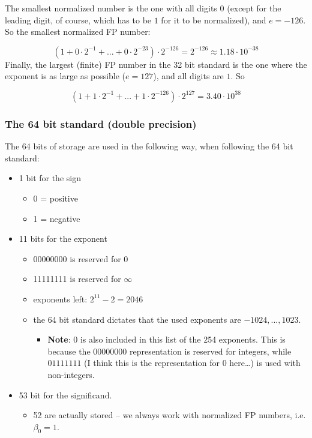 \documentclass[]{book}
\providecommand{\tightlist}{%
  \setlength{\itemsep}{0pt}\setlength{\parskip}{0pt}}
\theoremstyle{definition}
\theoremstyle{definition}
\theoremstyle{definition}
\theoremstyle{remark}
\begin{document}
The smallest normalized number is the one with all digits \(0\) (except
for the leading digit, of course, which has to be \(1\) for it to be
normalized), and \(e = -126\). So the smallest normalized FP number:

\[
\left(1 + 0\cdot 2^{-1} + ... + 0\cdot 2^{-23}\right)\cdot 2^{-126} = 2^{-126} \approx 1.18\cdot 10^{-38}
\] Finally, the largest (finite) FP number in the 32 bit standard is the
one where the exponent is as large as possible (\(e = 127\)), and all
digits are \(1\). So

\[
\left(1 + 1\cdot 2^{-1} + ... + 1\cdot 2^{-126}\right)\cdot 2^{127} = 3.40\cdot 10^{38}
\]

\subsubsection{The 64 bit standard (double
precision)}\label{the-64-bit-standard-double-precision}

The 64 bits of storage are used in the following way, when following the
64 bit standard:

\begin{itemize}
\tightlist
\item
  1 bit for the sign

  \begin{itemize}
  \tightlist
  \item
    0 = positive
  \item
    1 = negative
  \end{itemize}
\item
  11 bits for the exponent

  \begin{itemize}
  \tightlist
  \item
    00000000 is reserved for 0
  \item
    11111111 is reserved for \(\infty\)
  \item
    exponents left: \(2^11 - 2 = 2046\)
  \item
    the 64 bit standard dictates that the used exponents are
    \(-1024,...,1023\).

    \begin{itemize}
    \tightlist
    \item
      \textbf{Note}: \(0\) is also included in this list of the 254
      exponents. This is because the \(00000000\) representation is
      reserved for integers, while \(01111111\) (I think this is the
      representation for \(0\) here\ldots{}) is used with non-integers.
    \end{itemize}
  \end{itemize}
\item
  53 bit for the significand.

  \begin{itemize}
  \tightlist
  \item
    52 are actually stored -- we always work with normalized FP numbers,
    i.e. \(\beta_0 = 1\).
  \end{itemize}
\end{itemize}
\end{document}
